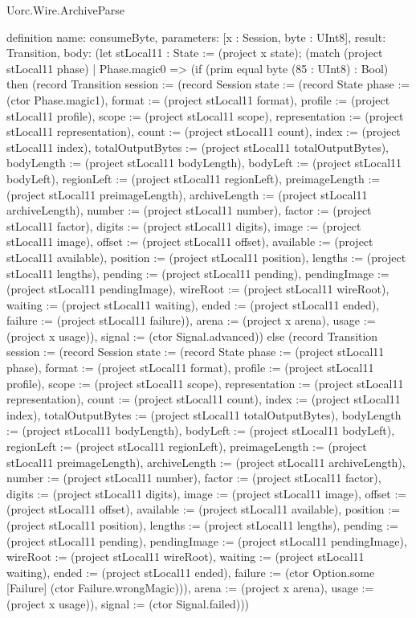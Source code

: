 \begin{lexlean}{Uorc.Wire.ArchiveParse}
\begin{semanticmodule}
definition{
  name: consumeByte,
  parameters: [x : Session, byte : UInt8],
  result: Transition,
  body: (let stLocal11 : State := (project x state); (match (project stLocal11 phase)
    | Phase.magic0 => (if (prim equal byte (85 : UInt8) : Bool) then (record Transition {session := (record Session {state := (record State {phase := (ctor Phase.magic1), format := (project stLocal11 format), profile := (project stLocal11 profile), scope := (project stLocal11 scope), representation := (project stLocal11 representation), count := (project stLocal11 count), index := (project stLocal11 index), totalOutputBytes := (project stLocal11 totalOutputBytes), bodyLength := (project stLocal11 bodyLength), bodyLeft := (project stLocal11 bodyLeft), regionLeft := (project stLocal11 regionLeft), preimageLength := (project stLocal11 preimageLength), archiveLength := (project stLocal11 archiveLength), number := (project stLocal11 number), factor := (project stLocal11 factor), digits := (project stLocal11 digits), image := (project stLocal11 image), offset := (project stLocal11 offset), available := (project stLocal11 available), position := (project stLocal11 position), lengths := (project stLocal11 lengths), pending := (project stLocal11 pending), pendingImage := (project stLocal11 pendingImage), wireRoot := (project stLocal11 wireRoot), waiting := (project stLocal11 waiting), ended := (project stLocal11 ended), failure := (project stLocal11 failure)}), arena := (project x arena), usage := (project x usage)}), signal := (ctor Signal.advanced)}) else (record Transition {session := (record Session {state := (record State {phase := (project stLocal11 phase), format := (project stLocal11 format), profile := (project stLocal11 profile), scope := (project stLocal11 scope), representation := (project stLocal11 representation), count := (project stLocal11 count), index := (project stLocal11 index), totalOutputBytes := (project stLocal11 totalOutputBytes), bodyLength := (project stLocal11 bodyLength), bodyLeft := (project stLocal11 bodyLeft), regionLeft := (project stLocal11 regionLeft), preimageLength := (project stLocal11 preimageLength), archiveLength := (project stLocal11 archiveLength), number := (project stLocal11 number), factor := (project stLocal11 factor), digits := (project stLocal11 digits), image := (project stLocal11 image), offset := (project stLocal11 offset), available := (project stLocal11 available), position := (project stLocal11 position), lengths := (project stLocal11 lengths), pending := (project stLocal11 pending), pendingImage := (project stLocal11 pendingImage), wireRoot := (project stLocal11 wireRoot), waiting := (project stLocal11 waiting), ended := (project stLocal11 ended), failure := (ctor Option.some [Failure] (ctor Failure.wrongMagic))}), arena := (project x arena), usage := (project x usage)}), signal := (ctor Signal.failed)}))
}
\end{semanticmodule}
\end{lexlean}
